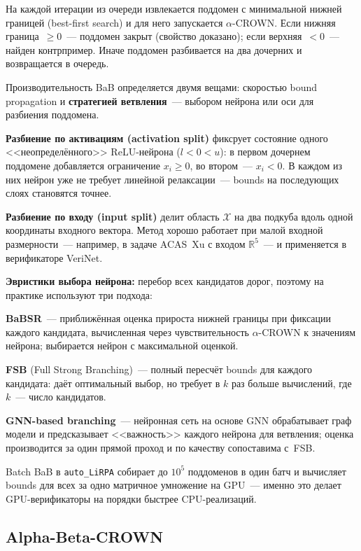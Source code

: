 На каждой итерации из очереди извлекается поддомен с минимальной
нижней границей (best-first search) и для него запускается
$\alpha$-CROWN.
Если нижняя граница~$\ge 0$~--- поддомен закрыт (свойство доказано);
если верхняя~$< 0$~--- найден контрпример.
Иначе поддомен разбивается на два дочерних и возвращается в очередь.

Производительность BaB определяется двумя вещами: скоростью
bound propagation и \textbf{стратегией ветвления}~--- выбором
нейрона или оси для разбиения поддомена.

\textbf{Разбиение по активациям (activation split)} фиксрует состояние одного <<неопределённого>> ReLU-нейрона
($l < 0 < u$): в первом дочернем поддомене добавляется ограничение
$x_i \ge 0$, во втором~--- $x_i < 0$.
В каждом из них нейрон уже не требует линейной релаксации~---
bounds на последующих слоях становятся точнее.

\textbf{Разбиение по входу (input split)} делит область $\mathcal{X}$ 
на два подкуба вдоль одной координаты входного вектора.
Метод хорошо работает при малой входной размерности~--- например,
в задаче ACAS~Xu с входом $\mathbb{R}^5$~--- и применяется
в верификаторе VeriNet.

\textbf{Эвристики выбора нейрона:} перебор всех кандидатов дорог, поэтому на практике используют три подхода:

\textbf{BaBSR}\cite{AlphaBetaCrownVNNCOMP23}~--- приближённая оценка
прироста нижней границы при фиксации каждого кандидата, вычисленная
через чувствительность $\alpha$-CROWN к значениям нейрона; выбирается
нейрон с максимальной оценкой.

\textbf{FSB} (Full Strong Branching)~--- полный пересчёт bounds
для каждого кандидата: даёт оптимальный выбор, но требует в $k$
раз больше вычислений, где $k$~--- число кандидатов.

\textbf{GNN-based branching}\cite{AlphaBetaCrownVNNCOMP23}~---
нейронная сеть на основе GNN обрабатывает граф модели и предсказывает
<<важность>> каждого нейрона для ветвления; оценка производится
за один прямой проход и по качеству сопоставима с~FSB.

Batch BaB в \texttt{auto\_LiRPA} собирает до $10^5$ поддоменов
в один батч и вычисляет bounds для всех за одно матричное умножение
на GPU~--- именно это делает GPU-верификаторы на порядки быстрее
CPU-реализаций.

\subsection{Alpha-Beta-CROWN}

